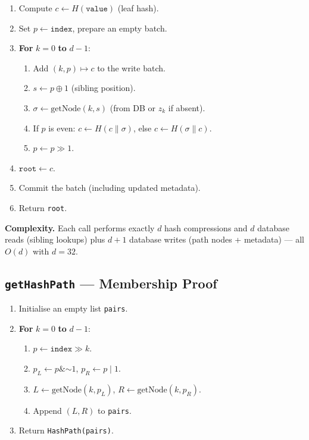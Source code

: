 \documentclass[12pt,a4paper]{article}
\begin{document}
\begin{tcolorbox}[title=Algorithm: updateElement(index, value)]
\begin{enumerate}[label=\textbf{Step \arabic*:}]
  \item Compute $c \leftarrow H(\texttt{value})$  (leaf hash).
  \item Set $p \leftarrow \texttt{index}$, prepare an empty batch.
  \item \textbf{For} $k = 0$ \textbf{to} $d-1$:
    \begin{enumerate}[label=(\alph*)]
      \item Add $(k, p) \mapsto c$ to the write batch.
      \item $s \leftarrow p \oplus 1$  (sibling position).
      \item $\sigma \leftarrow \mathrm{getNode}(k, s)$
            (from DB or $z_k$ if absent).
      \item If $p$ is even: $c \leftarrow H(c \| \sigma)$,
            else $c \leftarrow H(\sigma \| c)$.
      \item $p \leftarrow p \gg 1$.
    \end{enumerate}
  \item $\texttt{root} \leftarrow c$.
  \item Commit the batch (including updated metadata).
  \item Return \texttt{root}.
\end{enumerate}
\end{tcolorbox}

\textbf{Complexity.} Each call performs exactly $d$ hash compressions and $d$
database reads (sibling lookups) plus $d+1$ database writes (path nodes +
metadata) — all $O(d)$ with $d = 32$.

\subsection{\texttt{getHashPath} — Membership Proof}

\begin{tcolorbox}[title=Algorithm: getHashPath(index)]
\begin{enumerate}[label=\textbf{Step \arabic*:}]
  \item Initialise an empty list \texttt{pairs}.
  \item \textbf{For} $k = 0$ \textbf{to} $d-1$:
    \begin{enumerate}[label=(\alph*)]
      \item $p \leftarrow \texttt{index} \gg k$.
      \item $p_L \leftarrow p \mathbin{\&} \mathord{\sim}1$,\quad
            $p_R \leftarrow p \mathbin{|} 1$.
      \item $L \leftarrow \mathrm{getNode}(k, p_L)$,\quad
            $R \leftarrow \mathrm{getNode}(k, p_R)$.
      \item Append $(L, R)$ to \texttt{pairs}.
    \end{enumerate}
  \item Return \texttt{HashPath(pairs)}.
\end{enumerate}
\end{tcolorbox}
\end{document}
